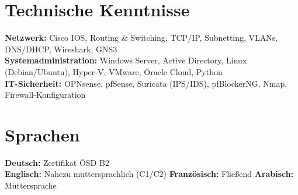 \documentclass[10pt,a4paper]{article}
\begin{document}
\section*{Technische Kenntnisse}
\textbf{Netzwerk:} Cisco IOS, Routing \& Switching, TCP/IP, Subnetting, VLANs, DNS/DHCP, Wireshark, GNS3 \\
\textbf{Systemadministration:} Windows Server, Active Directory, Linux (Debian/Ubuntu), Hyper-V, VMware, Oracle Cloud, Python \\
\textbf{IT-Sicherheit:} OPNsense, pfSense, Suricata (IPS/IDS), pfBlockerNG, Nmap, Firewall-Konfiguration

\section*{Sprachen}
\textbf{Deutsch:} Zertifikat ÖSD B2 \\
\textbf{Englisch:} Nahezu muttersprachlich (C1/C2) \textbar{} \textbf{Französisch:} Fließend \textbar{} \textbf{Arabisch:} Muttersprache
\end{document}
